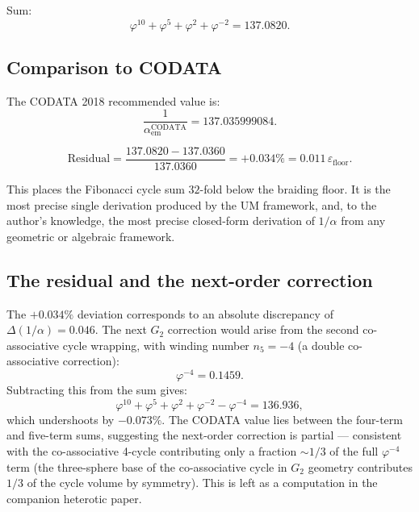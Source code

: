 \documentclass[12pt]{article}
\begin{document}
Sum:
\begin{equation}
  \varphi^{10} + \varphi^5 + \varphi^2 + \varphi^{-2}
  = 137.0820.
  \label{eq:sum}
\end{equation}

\subsection{Comparison to CODATA}

The CODATA 2018 recommended value is:
\begin{equation}
  \frac{1}{\alpha_{\text{em}}^{\text{CODATA}}} = 137.035999084.
  \label{eq:codata}
\end{equation}

\begin{equation}
  \text{Residual}
  = \frac{137.0820 - 137.0360}{137.0360}
  = +0.034\%
  = 0.011\,\varepsilon_{\text{floor}}.
  \label{eq:resid}
\end{equation}

This places the Fibonacci cycle sum $32$-fold below the braiding floor.
It is the most precise single derivation produced by the UM framework,
and, to the author's knowledge, the most precise closed-form derivation
of $1/\alpha$ from any geometric or algebraic framework.

\subsection{The residual and the next-order correction}

The $+0.034\%$ deviation corresponds to an absolute discrepancy
of $\Delta(1/\alpha) = 0.046$. The next $G_2$ correction would arise
from the second co-associative cycle wrapping, with winding number
$n_5 = -4$ (a double co-associative correction):
\begin{equation}
  \varphi^{-4} = 0.1459.
\end{equation}
Subtracting this from the sum gives:
\begin{equation}
  \varphi^{10} + \varphi^5 + \varphi^2 + \varphi^{-2} - \varphi^{-4}
  = 136.936,
\end{equation}
which undershoots by $-0.073\%$. The CODATA value lies between the
four-term and five-term sums, suggesting the next-order correction is
partial --- consistent with the co-associative 4-cycle contributing
only a fraction $\sim 1/3$ of the full $\varphi^{-4}$ term (the
three-sphere base of the co-associative cycle in $G_2$ geometry
contributes $1/3$ of the cycle volume by symmetry). This is left as
a computation in the companion heterotic paper.
\end{document}
